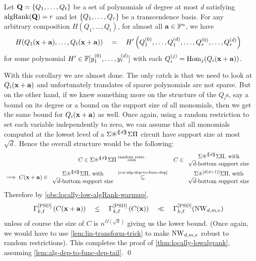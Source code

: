\begin{corollarywp}\label{cor:alg-dep-to-func-dep}
Let $\mathbf{Q} = \left\{Q_1,\ldots, Q_t\right\}$ be a set of polynomials of degree at most $d$ satisfying $\operatorname{\mathrm{algRank}}(\mathbf{Q})= r$ and let $\left\{Q_1,\ldots, Q_r\right\}$ be a transcendence basis. For any arbitrary composition $H(Q_1,\ldots, Q_t)$, for almost all $\mathbf{a} \in \mathbb{F}^n$, we have
\[
H(Q_1(\mathbf{x} + \mathbf{a}),\ldots, Q_t(\mathbf{x} + \mathbf{a})) \quad = \quad H'\left(Q_1^{(0)},\ldots,Q_1^{(d)}, \ldots, Q_r^{(0)}, \ldots, Q_{r}^{(d)}\right)
\]
for some polynomial $H' \in \mathbb{F}[y_{1}^{(0)},\ldots, y_{r}^{(d)}]$ with each $Q_i^{(j)} = \operatorname{Hom}_{j}(Q_i(\mathbf{x} + \mathbf{a}))$. 
\end{corollarywp}

With this corollary we are almost done.
The only catch is that we need to look at $Q_i(\mathbf{x} + \mathbf{a})$ and unfortunately translates of sparse polynomials are not sparse.
But on the other hand, if we knew something more on the structure of the $Q_i$s, say a bound on its degree or a bound on the support size of all monomials, then we get the same bound for $Q_i(\mathbf{x} + \mathbf{a})$ as well.
Once again, using a random restriction to set each variable independently to zero, we can assume that all monomials computed at the lowest level of a $\SASP{d}$ circuit have support size at most $\sqrt{d}$. Hence the overall structure would be the following:
\begin{eqnarray*}
C \in \SASP{d} & \stackrel{\text{random restr.}}{\Longrightarrow} &  C \in \begin{array}{c}\SASP{d}\text{, with}\\\text{$\sqrt{d}$-bottom support size}\end{array}
  \\
\implies C(\vecx + \veca) \in \begin{array}{c}\SASP{d}\text{, with}\\\text{$\sqrt{d}$-bottom support size}\end{array}& \stackrel{\text{\autoref{cor:alg-dep-to-func-dep}}}{\subseteq} & \begin{array}{c}\Sigma\circast^{[d(d+1)]}\Sigma\Pi\text{, with}\\\text{$\sqrt{d}$-bottom support size}\end{array}
\end{eqnarray*}
Therefore by \autoref{obs:locally-low-algRank-warmup}, 
\[
\Gamma^{\mathrm{[PSD]}}_{k,\ell}\left(C(\mathbf{x} + \mathbf{a})\right) \quad \leq \quad\Gamma^{\mathrm{[PSD]}}_{k,\ell}\left(C(\mathbf{x})\right) \quad \ll \quad \Gamma^{\mathrm{[PSD]}}_{k,\ell}(\operatorname{\mathrm{NW}}_{d,m,e})
\]
unless of course the size of $C$ is $n^{\Omega(\sqrt{d})}$ giving us the lower bound. (Once again, we would have to use \autoref{lem:lin-transform-trick} to make $\operatorname{\mathrm{NW}}_{d,m,e}$ robust to random restrictions). This completes the proof of \autoref{thm:locally-lowalgrank}, assuming \autoref{lem:alg-dep-to-func-dep-tail}. \qed{}\\

